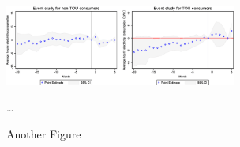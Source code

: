 \begin{figure}[H]
    \begin{center}
    \caption{Another Figure}
    \includegraphics[width=3.0in]{fig/Parallel_Trends_2.png}
    \end{center}
	\label{fig:mainsummary}
    \vspace{0.2cm}
    \begin{minipage}{0.95\textwidth} 
	{\footnotesize  \ldots
	\par
	}
	\end{minipage}
\end{figure}
